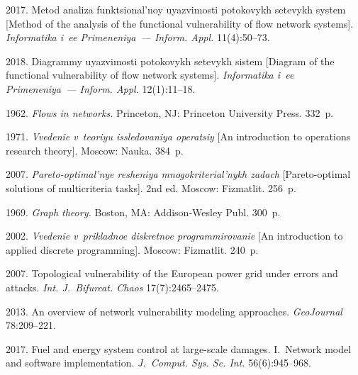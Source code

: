 
  \begin{multicols}{2}

\renewcommand{\bibname}{\protect\rmfamily References}

{\small\frenchspacing
 {%
 \begin{thebibliography}{99}

2017. Metod analiza funktsional'noy uyazvimosti potokovykh setevykh system 
[Method of the analysis of the functional vulnerability of flow network systems]. 
\textit{Informatika i~ee Primeneniya~--- Inform. Appl.} 11(4):50--73.

 2018. 
Diagrammy uyazvimosti potokovykh setevykh sistem [Diagram of the functional
 vulnerability of flow network systems]. 
 \textit{Informatika i~ee Primeneniya~--- Inform. Appl.} 12(1):11--18. 

 1962. 
\textit{Flows in networks.}  Princeton, NJ: Princeton University Press. 332~p. 

 1971. \textit{Vvedenie v~teoriyu issledovaniya operatsiy} 
[An introduction to operations research theory]. Moscow: Nauka. 384~p. 

  2007. 
\textit{Pareto-optimal'nye resheniya mnogokriterial'nykh zadach} 
[Pareto-optimal solutions of multicriteria tasks]. 2nd ed.  
Moscow: Fizmatlit. 256~p. 

 


 1969.
\textit{Graph theory.}  Boston, MA: Addison-Wesley Publ. 300~p.

 2002. 
\textit{Vvedenie v~prikladnoe diskretnoe programmirovanie}
[An introduction to applied discrete programming]. Moscow: Fizmatlit. 240~p. 

  2007. 
Topological vulnerability of the European power grid under errors and attacks. 
\textit{Int. J.~Bifurcat.  Chaos} 17(7):2465--2475. 

 2013. An overview of network vulnerability modeling approaches. 
\textit{GeoJournal} 78:209--221.

2017. Fuel and energy system control at large-scale damages. 
I.~Network model and software implementation.  
\textit{J.~Comput.  Sys. Sc. Int.}  56(6):945--968.    
\end{thebibliography}

 }
 }

\end{multicols}

